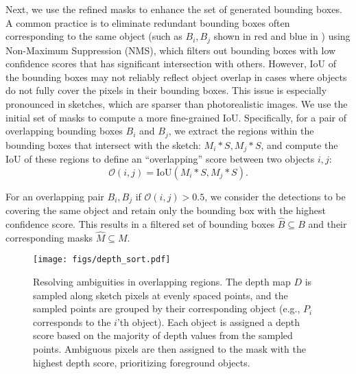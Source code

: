 Next, we use the refined masks to enhance the set of generated bounding boxes. A common practice is to eliminate redundant bounding boxes often corresponding to the same object (such as $B_i, B_j$ shown in red and blue in ) using Non-Maximum Suppression (NMS), which filters out bounding boxes with low confidence scores that has significant intersection with others. However, IoU of the bounding boxes may not reliably reflect object overlap in cases where objects do not fully cover the pixels in their bounding boxes. This issue is especially pronounced in sketches, which are sparser than photorealistic images.
We use the initial set of masks to compute a more fine-grained IoU. Specifically, for a pair of overlapping bounding boxes $B_i$ and $B_j$, we extract the regions within the bounding boxes that intersect with the sketch: $M_i * S, M_j * S$, and compute the IoU of these regions to define an ``overlapping'' score between two objects $i, j$:
\begin{equation} 
\mathcal{O}(i, j) = \text{IoU}(M_i * S, M_j * S).
\end{equation}


For an overlapping pair $B_i, B_j$ if $\mathcal{O}(i, j) > 0.5$, we consider the detections to be covering the same object and retain only the bounding box with the highest confidence score.
This results in a filtered set of bounding boxes $\hat{B}\subseteq B$ and their corresponding masks $\hat{M} \subseteq M$.



\begin{figure}
    \centering
    \texttt{[image: figs/depth\_sort.pdf]}
    \caption{Resolving ambiguities in overlapping regions. The depth map $D$ is sampled along sketch pixels at evenly spaced points, and the sampled points are grouped by their corresponding object (e.g., $P_i$ corresponds to the $i$'th object). Each object is assigned a depth score based on the majority of depth values from the sampled points. Ambiguous pixels are then assigned to the mask with the highest depth score, prioritizing foreground objects.}
    \label{fig:mask-sort}
\end{figure}

